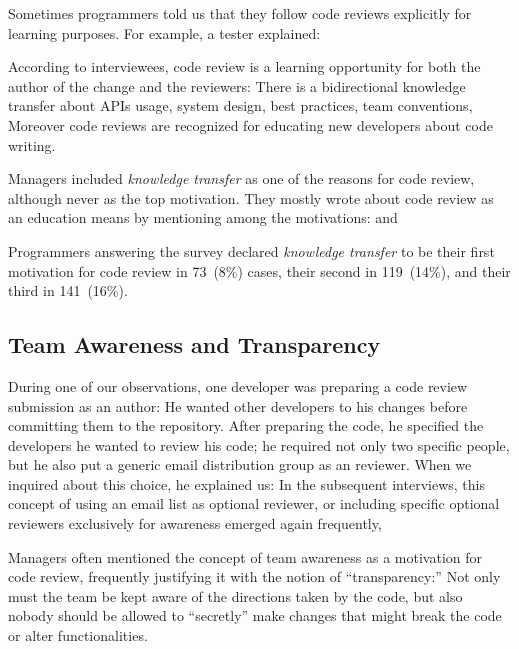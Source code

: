 Sometimes programmers told us that they follow code reviews explicitly for
learning purposes. For example, a tester explained: 

According to interviewees, code review is a learning opportunity for both the
author of the change and the reviewers: There is a bidirectional knowledge
transfer about APIs usage, system design, best practices, team conventions,
 \etc Moreover code reviews are recognized
for educating new developers about code writing.

Managers included \emph{knowledge transfer} as one of the reasons for code review,
although never as the top motivation. They mostly wrote about code review as an
education means by mentioning among the motivations:
  and 

Programmers answering the survey declared \emph{knowledge transfer} to be their
first motivation for code review in 73~(8\%) cases, their second in 119~(14\%),
and their third in 141~(16\%).

\subsection{Team Awareness and Transparency}

During one of our observations, one developer was preparing a code review
submission as an author: He wanted other developers to 
his changes before committing them to the repository. After preparing the code,
he specified the developers he wanted to review his code; he required not only
two specific people, but he also put a generic email distribution group as an
 reviewer. When we inquired about this choice, he explained
us:  In the subsequent
interviews, this concept of using an email list as optional reviewer, or
including specific optional reviewers exclusively for awareness emerged again
frequently, \eg {}

Managers often mentioned the concept of team awareness as a motivation for code
review, frequently justifying it with the notion of ``transparency:'' Not only
must the team be kept aware of the directions taken by the code, but also
nobody should be allowed to ``secretly'' make changes that might break the code
or alter functionalities.

